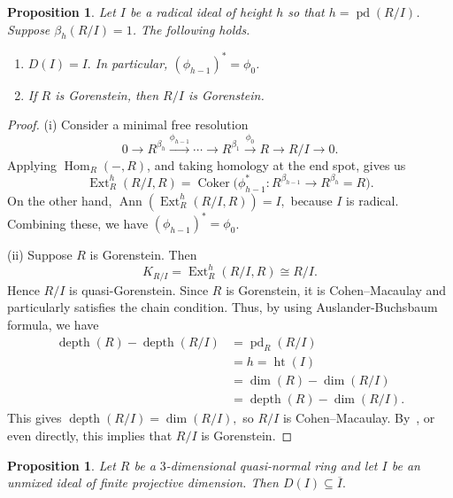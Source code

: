 \documentclass[11pt,a4paper]{amsart}
\numberwithin{equation}{section}
\newtheorem{proposition}[theorem]{Proposition}
\DeclareMathOperator{\pd}{pd}
\DeclareMathOperator{\depth}{depth}
\newcommand{\lo}{\longrightarrow}
\begin{document}
\begin{proposition}
	Let $I$ be a radical ideal of height $h$ so that $h=\pd (R/I)$.
	Suppose $\beta_h(R/I)=1$. The following holds.
	
	\begin{enumerate}
		\item[(i)]
		\( D(I)=I.
		\) In particular, $(\phi_{h-1})^\ast=\phi_0$.
		\item[(ii)]
		If $R$ is Gorenstein, then $R/I$ is Gorenstein. 
	\end{enumerate}
	
\end{proposition}
\begin{proof}
(i)	Consider a minimal free resolution
	\[
	0 \longrightarrow R^{\beta_h} \stackrel{\phi_{h-1}}\longrightarrow \cdots
	\longrightarrow R^{\beta_1} \stackrel{\phi_0}\longrightarrow R \longrightarrow R/I \longrightarrow 0.
	\]
	Applying $\operatorname{Hom}_R(-,R)$, and taking homology at the end spot, gives us
	\[
	\operatorname{Ext}^h_R(R/I,R)=\operatorname{Coker}
	\bigl(\phi_{h-1}^\ast :R^{\beta_{h-1}}\lo R^{\beta_h}=R\bigr).
	\]
	On the other hand,
	\(
	\operatorname{Ann}\! (\operatorname{Ext}^h_R(R/I,R) )=I,
	\)
	because  $I$ is radical. Combining these, we have $(\phi_{h-1})^\ast=\phi_0$.
	
	
	(ii) Suppose $R$ is Gorenstein. Then
	\[
	K_{R/I}
	=\operatorname{Ext}^h_R(R/I,R)
	\cong R/I.
	\]
	Hence $R/I$ is quasi-Gorenstein.
	Since $R$ is Gorenstein, it is Cohen--Macaulay and particularly
	satisfies the chain condition. Thus,
	by using Auslander-Buchsbaum  formula, we have\[
	\begin{array}{ll}
	\depth(R)-\depth(R/I)  &=\operatorname{pd}_R(R/I) \\
	& =h =\operatorname{ht}(I)\\
	&=\dim (R)-\dim (R/I)\\
	&=\depth(R)-\dim (R/I).
	\end{array}
	\]  
	This gives
	\(
	\depth(R/I)=\dim(R/I),
	\)
	so $R/I$ is Cohen--Macaulay.
	By~\cite[Page 120]{BH}, or even directly, 
	this implies that $R/I$ is Gorenstein.
\end{proof}

	

\begin{proposition}\label{6.7}
	Let $R$ be a $3$-dimensional quasi-normal ring and let $I$ be an unmixed ideal of finite projective dimension. Then
	\(
	D(I)\subseteq \overline{I}.
	\)
\end{proposition}
\end{document}
